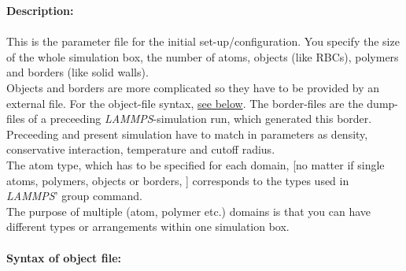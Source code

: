 \textbf{Description:}\\ \\
This is the parameter file for the initial set-up/configuration. You specify the size of the whole simulation box, the number of atoms, objects (like RBCs), polymers and borders (like solid walls).\\Objects and borders are more complicated so they have to be provided by an external file. For the object-file syntax, \hyperlink{syn:object_file}{see below}. The border-files are the dump-files of a preceeding \textit{LAMMPS}-simulation run, which generated this border. Preceeding and present simulation have to match in parameters as density, conservative interaction, temperature and cutoff radius.\\The atom type, which has to be specified for each domain, [no matter if single atoms, polymers, objects or borders, ] corresponds to the types used in \textit{LAMMPS}' group command.\\The purpose of multiple (atom, polymer etc.) domains is that you can have different types or arrangements within one simulation box. 
\\ \\
\textbf{Syntax of object file:}
\hypertarget{syn:object_file}{}
